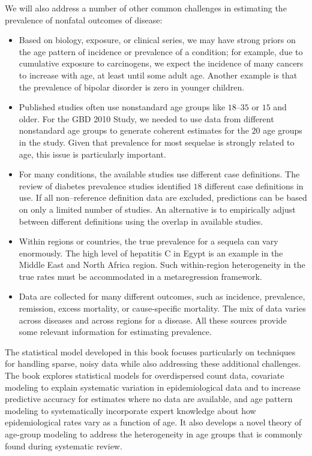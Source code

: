 We will also address a number of other common challenges in estimating the
prevalence of nonfatal outcomes of disease:
\begin{itemize}
\item Based on biology, exposure, or clinical series, we may have strong
priors on the age pattern of incidence or prevalence of a condition;
for example, due to cumulative exposure to carcinogens, we expect the
incidence of many cancers to increase with
age, at least until some
adult age.  Another example is that the prevalence of bipolar
disorder is zero in younger children.

\item Published studies often use nonstandard age groups like $18$--$35$
or $15$ and older.  For the GBD 2010 Study, we needed to use data from different
nonstandard age groups to generate coherent estimates for the $20$
age groups in the study.  Given that prevalence for most sequelae is
strongly related to age, this issue is particularly important.

\item For many conditions, the available studies use
different case definitions.  The review of diabetes prevalence studies
identified $18$ different case definitions in use.  If all non--reference
definition data are excluded, predictions can be based on only a
limited number of studies.  An alternative is to empirically
adjust between different definitions using the overlap
in available studies.

\item Within regions or
countries, the true prevalence for a sequela can vary enormously. The
high level of hepatitis C in Egypt is an example in the Middle East
and North Africa region.  Such within-region heterogeneity in the true
rates must be accommodated in a metaregression framework.

\item Data are collected for many different outcomes,
such as incidence, prevalence, remission, excess mortality, or
cause-specific mortality.  The mix of data varies across diseases and
across regions for a disease.  All these sources provide some
relevant information for estimating prevalence.
\end{itemize}

The statistical model developed in this book focuses
particularly on techniques for handling sparse, noisy data while also
addressing these additional challenges.  The book explores statistical
models for overdispersed count data, covariate modeling to explain
systematic variation in epidemiological data and to increase predictive
accuracy for estimates where no data are available, and age pattern
modeling to systematically incorporate expert knowledge about how
epidemiological rates vary as a function of age.  It also develops a
novel theory of age-group modeling to address the heterogeneity in
age groups that is commonly found during systematic review.

